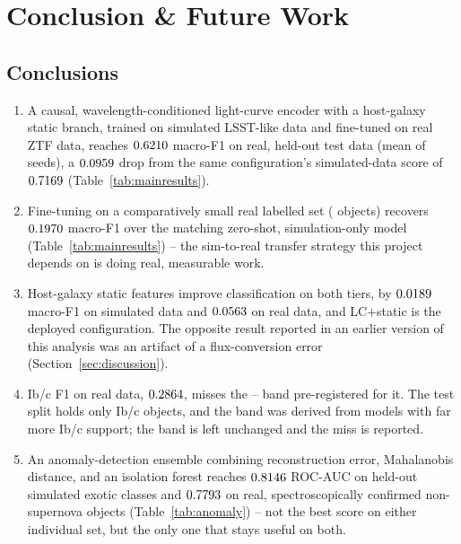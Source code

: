 \chapter{Conclusion \& Future Work}
\label{sec:conclusion}

\section{Conclusions}

\begin{enumerate}
  \item A causal, wavelength-conditioned light-curve encoder with a
    host-galaxy static branch, trained on simulated LSST-like data and
    fine-tuned on real ZTF data, reaches $0.6210{}$ macro-F1 on
    real, held-out test data (mean of \TierBNSeeds{} seeds), a
    $0.0959{}$ drop from the same configuration's simulated-data
    score of $0.7169{}$ (Table~\ref{tab:mainresults}).
  \item Fine-tuning on a comparatively small real labelled set
    (\TierBLabeledTrain{} objects) recovers $0.1970{}$ macro-F1 over
    the matching zero-shot, simulation-only model
    (Table~\ref{tab:mainresults}) -- the sim-to-real transfer strategy this
    project depends on is doing real, measurable work.
  \item Host-galaxy static features improve classification on both tiers,
    by $0.0189{}$ macro-F1 on simulated data and $0.0563{}$
    on real data, and LC+static is the deployed configuration. The
    opposite result reported in an earlier version of this analysis was an
    artifact of a flux-conversion error (Section~\ref{sec:discussion}).
  \item Ib/c F1 on real data, $0.2864{}$, misses the
    \IbcBandLow{}--\IbcBandHigh{} band pre-registered for it. The test split
    holds only \TierBSupportIbc{} Ib/c objects, and the band was derived from
    models with far more Ib/c support; the band is left unchanged and the
    miss is reported.
  \item An anomaly-detection ensemble combining reconstruction error,
    Mahalanobis distance, and an isolation forest reaches
    $0.8146{}$ ROC-AUC on held-out simulated
    exotic classes and $0.7793{}$ on real,
    spectroscopically confirmed non-supernova objects
    (Table~\ref{tab:anomaly}) -- not the best score on either individual
    set, but the only one that stays useful on both.

\end{enumerate}
